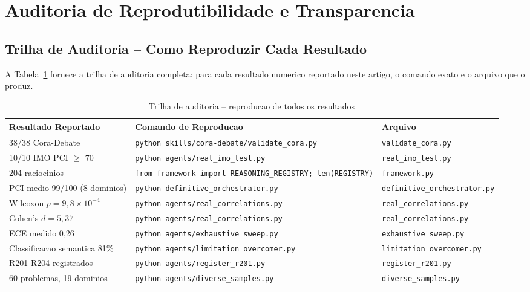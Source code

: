 \documentclass[5p]{elsarticle}
\begin{document}
\section{Auditoria de Reprodutibilidade e Transparencia}

\subsection{Trilha de Auditoria -- Como Reproduzir Cada Resultado}

A Tabela~\ref{tab:audit} fornece a trilha de auditoria completa: para cada
resultado numerico reportado neste artigo, o comando exato e o arquivo que o
produz.

\begin{table}[H]
 \centering
 \caption{Trilha de auditoria -- reproducao de todos os resultados}
 \label{tab:audit}
 \footnotesize
 \begin{tabular}{p{3cm}p{5cm}p{5cm}}
 \toprule
 \textbf{Resultado Reportado} & \textbf{Comando de Reproducao} & \textbf{Arquivo}\\
 \midrule
 38/38 Cora-Debate & \texttt{python skills/cora-debate/validate\_cora.py} & \texttt{validate\_cora.py}\\
 10/10 IMO PCI $\geq$ 70 & \texttt{python agents/real\_imo\_test.py} & \texttt{real\_imo\_test.py}\\
 204 raciocinios & \texttt{from framework import REASONING\_REGISTRY; len(REGISTRY)} & \texttt{framework.py}\\
 PCI medio 99/100 (8 dominios) & \texttt{python definitive\_orchestrator.py} & \texttt{definitive\_orchestrator.py}\\
 Wilcoxon $p=9,8\times10^{-4}$ & \texttt{python agents/real\_correlations.py} & \texttt{real\_correlations.py}\\
 Cohen's $d=5,37$ & \texttt{python agents/real\_correlations.py} & \texttt{real\_correlations.py}\\
 ECE medido 0,26 & \texttt{python agents/exhaustive\_sweep.py} & \texttt{exhaustive\_sweep.py}\\
 Classificacao semantica 81\% & \texttt{python agents/limitation\_overcomer.py} & \texttt{limitation\_overcomer.py}\\
 R201-R204 registrados & \texttt{python agents/register\_r201.py} & \texttt{register\_r201.py}\\
 60 problemas, 19 dominios & \texttt{python agents/diverse\_samples.py} & \texttt{diverse\_samples.py}\\
 \bottomrule
 \end{tabular}
\end{table}
\end{document}
